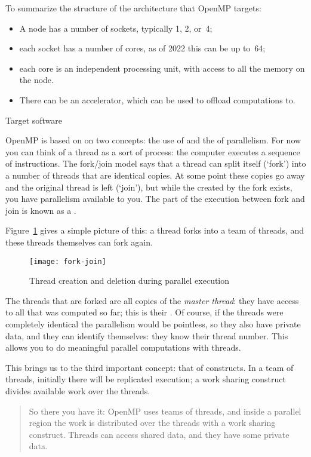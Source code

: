 To summarize the structure of the architecture that OpenMP targets:
\begin{itemize}
\item A node has a number of sockets, typically 1, 2, or~4;
\item each socket has a number of cores, as of 2022 this can be up to~64;
\item each core is an independent processing unit, with access to all
  the memory on the node.
\item There can be an accelerator, which can be used to offload computations to.
\end{itemize}

 {Target software}

OpenMP is based on on two concepts: the use of 
and the  of
parallelism. For now you can think of a thread as a sort of process:
the computer executes a sequence of instructions.
The fork/join model says that a thread can split itself (`fork')
into a number of threads that are identical copies. At some point
these copies go away and the original thread is left (`join'),
but while the  created by the fork exists,
you have parallelism available to you. The part of the execution
between fork and join is known as a .

Figure~\ref{fig:forkjoin} gives a simple picture of this:
a thread forks into a team of threads, and these threads
themselves can fork again.
\begin{figure}[ht]
\texttt{[image: fork-join]}
\caption{Thread creation and deletion during parallel execution}
\label{fig:forkjoin}
\end{figure}

The threads that are forked are all copies of the
\emph{master thread}: they have access to all that was
computed so far; this is their .  Of course, if
the threads were completely identical the parallelism would be
pointless, so they also have private data, and they can identify
themselves: they know their thread number.  This allows you to do
meaningful parallel computations with threads.

This brings us to the third important concept: that of 
constructs. In a team of threads, initially there will be replicated execution;
a work sharing construct divides available work over the threads.

\begin{quote}
  So there you have it: OpenMP uses teams of threads, and inside
  a parallel region the work is distributed over the threads with a work sharing construct.
  Threads can access shared data, and they have some private data.
\end{quote}


